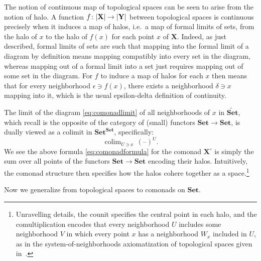 \documentclass[11pt, oneside, article]{memoir}
\theoremstyle{plain}
\theoremstyle{definition}
\theoremstyle{remark}
\newenvironment{remark}
{\renewcommand\qedsymbol{$\lrcorner$}%
  \pushQED{\qed}\myremark}
{\popQED\endmyremark}
\DeclareMathOperator*{\colim}{colim}
\DeclarePairedDelimiter{\abs}{\lvert}{\rvert}
\newcommand{\dash}{{\mathord{\text{--}}}}
\newcommand{\namedcat}[1]{\mathbf{#1}}
\newcommand{\spa}[1]{\mathbf{#1}}
\newcommand{\Set}{\namedcat{Set}}
\newcommand{\pts}[1]{{\abs{#1}}}
\newcommand{\fun}[2]{{#2}^{#1}}
\newcommand{\End}[1]{\fun{#1}{#1}}
\newcommand{\SetSet}{\End{\Set}}
\newcommand{\cmnd}[1]{{#1}}
\newcommand{\xU}{U}
\newcommand{\xV}{V}
\newcommand{\xW}{W}
\newcommand{\cC}{\cmnd{C}}
\newcommand{\tX}{\spa{X}}
\newcommand{\tY}{\spa{Y}}
\newcommand{\cX}{\toptocmd{\tX}}
\newcommand{\toptocmd}[1]{{{#1}^\circ}}
\begin{document}
\begin{remark}\label{rem:continuous}
  The notion of continuous map of topological spaces can be seen to
  arise from the notion of halo. A function
  $f \colon \pts{\tX} \to \pts{\tY}$ between topological spaces is
  continuous precisely when it induces a map of halos, i.e.\ a map of
  formal limits of sets, from the halo of $x$ to the halo of $f(x)$
  for each point $x$ of $\tX$. Indeed, as just described, formal
  limits of sets are such that mapping into the formal limit of a
  diagram by definition means mapping compatibly into every set in the
  diagram, whereas mapping out of a formal limit into a set just
  requires mapping out of some set in the diagram.  For $f$ to induce
  a map of halos for each $x$ then means that for every neighborhood
  $\epsilon \ni f(x)$, there exists a neighborhood $\delta \ni x$
  mapping into it, which is the usual epsilon-delta definition of
  continuity.
\end{remark}

The limit of the diagram \eqref{eq:comonadlimit} of all neighborhoods
of $x$ in $\widetilde{\Set}$, which recall is the opposite of the
category of (small) functors $\Set \to \Set$, is dually viewed as a
colimit in $\SetSet$, specifically:
\[\colim_{U \ni x} \, (\dash)^\xU.\] We see the above formula \eqref{eq:comonadformula}
for the comonad $\cX$ is simply the sum over all points of the
functors $\Set \to \Set$ encoding their halos. Intuitively, the
comonad structure then specifies how the halos cohere together as a
space.\footnote{Unravelling details, the counit specifies the central
  point in each halo, and the comultiplication encodes that every
  neighborhood $\xU$ includes some neighborhood $\xV$ in which every
  point $x$ has a neighborhood $\xW_x$ included in $\xU$, as in the
  system-of-neighborhoods axiomatization of topological spaces given
  in~\cite{willard}.}

Now we generalize from topological spaces to comonads on $\Set$.


\end{document}
